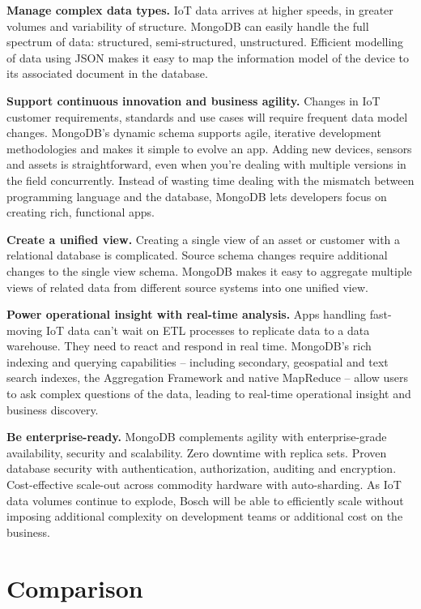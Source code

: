 \documentclass[9pt,twocolumn,twoside]{../../styles/osajnl}
\begin{document}
{\bfseries Manage complex data types.} IoT data arrives at higher speeds, in greater volumes and variability of structure. MongoDB can easily handle the full spectrum of data: structured, semi-structured, unstructured. Efficient modelling of data using JSON makes it easy to map the information model of the device to its associated document in the database.

{\bfseries Support continuous innovation and business agility.} Changes in IoT customer requirements, standards and use cases will require frequent data model changes. MongoDB’s dynamic schema supports agile, iterative development methodologies and makes it simple to evolve an app. Adding new devices, sensors and assets is straightforward, even when you’re dealing with multiple versions in the field concurrently. Instead of wasting time dealing with the mismatch between programming language and the database, MongoDB lets developers focus on creating rich, functional apps.

{\bfseries Create a unified view.} Creating a single view of an asset or customer with a relational database is complicated. Source schema changes require additional changes to the single view schema. MongoDB makes it easy to aggregate multiple views of related data from different source systems into one unified view.

{\bfseries Power operational insight with real-time analysis.} Apps handling fast-moving IoT data can’t wait on ETL processes to replicate data to a data warehouse. They need to react and respond in real time. MongoDB’s rich indexing and querying capabilities – including secondary, geospatial and text search indexes, the Aggregation Framework and native MapReduce – allow users to ask complex questions of the data, leading to real-time operational insight and business discovery.

{\bfseries Be enterprise-ready.} MongoDB complements agility with enterprise-grade availability, security and scalability. Zero downtime with replica sets. Proven database security with authentication, authorization, auditing and encryption. Cost-effective scale-out across commodity hardware with auto-sharding. As IoT data volumes continue to explode, Bosch will be able to efficiently scale without imposing additional complexity on development teams or additional cost on the business.


\section{Comparison}
\end{document}
